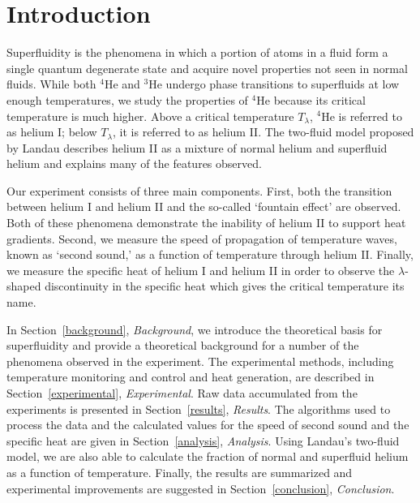
\section{Introduction}\label{introduction}

Superfluidity is the phenomena in which a portion of atoms in a fluid form a single quantum degenerate state and acquire novel properties not seen in normal fluids. While both $^{4}$He and $^{3}$He undergo phase transitions to superfluids at low enough temperatures, we study the properties of $^{4}$He because its critical temperature is much higher. Above a critical temperature $T_{\lambda}$, $^{4}$He is referred to as helium I; below $T_{\lambda}$, it is referred to as helium II. The two-fluid model proposed by Landau \cite{landau} describes helium II as a mixture of normal helium and superfluid helium and explains many of the features observed.

Our experiment consists of three main components. First, both the transition between helium I and helium II and the so-called `fountain effect' are observed. Both of these phenomena demonstrate the inability of helium II to support heat gradients. Second, we measure the speed of propagation of temperature waves, known as `second sound,'  as a function of temperature through helium II. Finally, we measure the specific heat of helium I and helium II in order to observe the $\lambda$-shaped discontinuity in the specific heat which gives the critical temperature its name.

In Section~\ref{background}, \emph{Background}, we introduce the theoretical basis for superfluidity and provide a theoretical background for a number of the phenomena observed in the experiment. The experimental methods, including temperature monitoring and control and heat generation, are described in Section~\ref{experimental}, \emph{Experimental}. Raw data accumulated from the experiments is presented in Section~\ref{results}, \emph{Results}. The algorithms used to process the data and the calculated values for the speed of second sound and the specific heat are given in Section~\ref{analysis}, \emph{Analysis}. Using Landau's two-fluid model, we are also able to calculate the fraction of normal and superfluid helium as a function of temperature. Finally, the results are summarized and experimental improvements are suggested in Section~\ref{conclusion}, \emph{Conclusion}.
